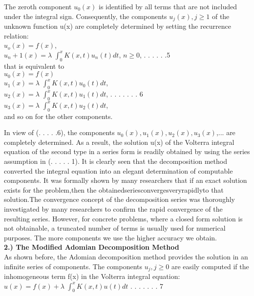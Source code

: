 \documentclass[12pt]{article}
\begin{document}
The zeroth component $u_0(x)$ is identiﬁed by all terms that are not included under the integral sign. Consequently, the components $u_j(x), j \geq 1$ of the unknown function u(x) are completely determined by setting the recurrence relation: \\

$u_o(x) = f(x)$,\\
$u_n+1(x) = \lambda$ \(\int_{0}^{x} K(x,t) u_n(t) dt\), 	$n \geq 0$,			. . . . . .5\\

that is equivalent to\\

$u_0(x) = f(x)$\\
$u_1(x) =  \lambda$ \(\int_{0}^{x} K(x,t) u_0(t) dt\),\\
$u_2(x) =  \lambda$ \(\int_{0}^{x} K(x,t) u_1(t) dt\),			. . . . . . . 6\\
$u_3(x) =  \lambda$ \(\int_{0}^{x} K(x,t) u_2(t) dt\),\\

and so on for the other components.
\par In view of (.  . . . .6), the components $u_0(x),u_1(x),u_2(x),u_3(x)$,... are completely determined. As a result, the solution u(x) of the Volterra integral equation of the second type in a series form is readily obtained by using the series assumption in (. . . . . 1). It is clearly seen that the decomposition method converted the integral equation into an elegant determination of computable components. It was formally shown by many researchers that if an exact solution exists for the problem,then the obtainedseriesconvergesveryrapidlyto that solution.The convergence concept of the decomposition series was thoroughly investigated by many researchers to conﬁrm the rapid convergence of the resulting series. However, for concrete problems, where a closed form solution is not obtainable, a truncated number of terms is usually used for numerical purposes. The more components we use the higher accuracy we obtain. \\

\textbf{2.)	The Modified Adomian Decomposition Method}\\
As shown before, the Adomian decomposition method provides the solution in an inﬁnite series of components. The components $u_j,j \geq 0$ are easily computed if the inhomogeneous term f(x) in the Volterra integral equation: \\

$u(x) = f(x) +  \lambda$ \(\int_{0}^{x} K(x,t) u(t) dt\)			. . . . . . . 7\\
\end{document}
